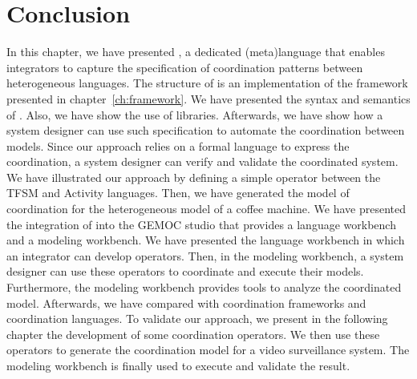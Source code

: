 \section{Conclusion}
In this chapter, we have presented \bcool, a dedicated (meta)language that enables integrators to capture the specification of coordination patterns between heterogeneous languages. The structure of \bcool is an implementation of the framework presented in chapter~\ref{ch:framework}. We have presented the syntax and semantics of \bcool. Also, we have show the use of \moccml libraries. Afterwards, we have show how a system designer can use such specification to automate the coordination between models. Since our approach relies on a formal language to express the coordination, a system designer can verify and validate the coordinated system. We have illustrated our approach by defining a simple operator between the TFSM and Activity languages. Then, we have generated the model of coordination for the heterogeneous model of a coffee machine. We have presented the integration of \bcool into the GEMOC studio that provides a language workbench and a modeling workbench. We have presented the language workbench in which an integrator can develop \bcool operators. Then, in the modeling workbench, a system designer can use these operators to coordinate and execute their models. Furthermore, the modeling workbench provides tools to analyze the coordinated model. Afterwards, we have compared \bcool with coordination frameworks and coordination languages. To validate our approach, we present in the following chapter the development of some \bcool coordination operators. We then use these operators to generate the coordination model for a video surveillance system. The modeling workbench is finally used to execute and validate the result.


